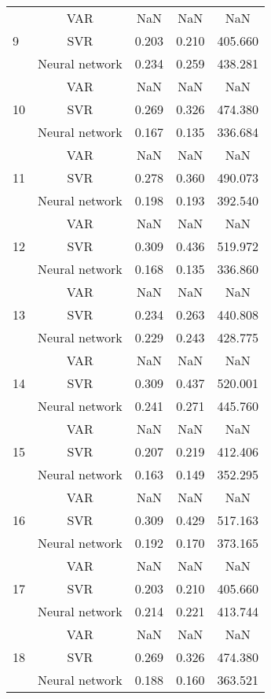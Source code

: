 \documentclass[12pt]{article}
\begin{document}
\begin{longtable}{|p{2cm}|c|c|c|c|}
\cline{2-5}
\hline
\multirow{3}{*}{9} &VAR &   NaN &    NaN &    NaN\\ 
\cline{2-5}
 &SVR &   0.203 &    0.210 &    405.660\\ 
\cline{2-5}
 &Neural network &   0.234 &    0.259 &    438.281\\ 
\cline{2-5}
\hline
\multirow{3}{*}{10} &VAR &   NaN &    NaN &    NaN\\ 
\cline{2-5}
 &SVR &   0.269 &    0.326 &    474.380\\ 
\cline{2-5}
 &Neural network &   0.167 &    0.135 &    336.684\\ 
\cline{2-5}
\hline
\multirow{3}{*}{11} &VAR &   NaN &    NaN &    NaN\\ 
\cline{2-5}
 &SVR &   0.278 &    0.360 &    490.073\\ 
\cline{2-5}
 &Neural network &   0.198 &    0.193 &    392.540\\ 
\cline{2-5}
\hline
\multirow{3}{*}{12} &VAR &   NaN &    NaN &    NaN\\ 
\cline{2-5}
 &SVR &   0.309 &    0.436 &    519.972\\ 
\cline{2-5}
 &Neural network &   0.168 &    0.135 &    336.860\\ 
\cline{2-5}
\hline
\multirow{3}{*}{13} &VAR &   NaN &    NaN &    NaN\\ 
\cline{2-5}
 &SVR &   0.234 &    0.263 &    440.808\\ 
\cline{2-5}
 &Neural network &   0.229 &    0.243 &    428.775\\ 
\cline{2-5}
\hline
\multirow{3}{*}{14} &VAR &   NaN &    NaN &    NaN\\ 
\cline{2-5}
 &SVR &   0.309 &    0.437 &    520.001\\ 
\cline{2-5}
 &Neural network &   0.241 &    0.271 &    445.760\\ 
\cline{2-5}
\hline
\multirow{3}{*}{15} &VAR &   NaN &    NaN &    NaN\\ 
\cline{2-5}
 &SVR &   0.207 &    0.219 &    412.406\\ 
\cline{2-5}
 &Neural network &   0.163 &    0.149 &    352.295\\ 
\cline{2-5}
\hline
\multirow{3}{*}{16} &VAR &   NaN &    NaN &    NaN\\ 
\cline{2-5}
 &SVR &   0.309 &    0.429 &    517.163\\ 
\cline{2-5}
 &Neural network &   0.192 &    0.170 &    373.165\\ 
\cline{2-5}
\hline
\multirow{3}{*}{17} &VAR &   NaN &    NaN &    NaN\\ 
\cline{2-5}
 &SVR &   0.203 &    0.210 &    405.660\\ 
\cline{2-5}
 &Neural network &   0.214 &    0.221 &    413.744\\ 
\cline{2-5}
\hline
\multirow{3}{*}{18} &VAR &   NaN &    NaN &    NaN\\ 
\cline{2-5}
 &SVR &   0.269 &    0.326 &    474.380\\ 
\cline{2-5}
 &Neural network &   0.188 &    0.160 &    363.521\\ 
\cline{2-5}
\hline
\end{longtable}
\end{document}

